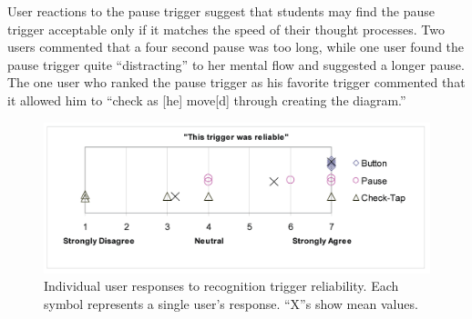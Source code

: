 \documentclass{elsart}
\begin{document}


User reactions to the pause trigger suggest that students may
find the pause trigger acceptable only if it matches the speed of their
thought processes.  Two users commented that a four second pause was
too long, while one user found the pause trigger quite ``distracting''
to her mental flow and suggested a longer pause.  The one user who
ranked the pause trigger as his favorite trigger commented that it
allowed him to ``check as [he] move[d] through creating the diagram.''

\begin{figure}[tb]
  \centering
  \includegraphics[width=1.0\linewidth]{buttonReliable-bigger.png}
  \caption{\label{fig:buttonReliabilityChart} Individual user responses
           to recognition trigger reliability. Each symbol represents
           a single user's response.  ``X''s show mean values.}
\end{figure}
\end{document}
